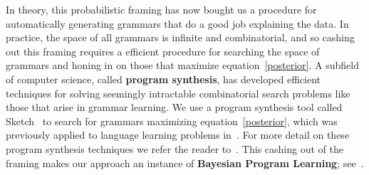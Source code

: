 \documentclass{article}
\begin{document}
In theory, this probabilistic framing
has now bought us a procedure for automatically generating
grammars that do a good job explaining the data.
In practice,
the space of all grammars is infinite and combinatorial,
and so cashing out this framing requires a
efficient procedure for searching the space of grammars and honing in on those that maximize equation~\ref{posterior}.
A subfield of computer science, called \textbf{program synthesis},
has developed efficient techniques for
solving seemingly intractable combinatorial search problems
like those that arise in grammar learning.
We use a program synthesis tool called Sketch~\citep{solar2008program}
to search for grammars maximizing equation~\ref{posterior},
which was previously applied to language learning problems in~\cite{ellis2015unsupervised}.
For more detail on these program synthesis techniques we refer the reader to~\cite{solar2008program}.
This cashing out of the framing makes
our approach an instance of  \textbf{Bayesian Program Learning}; see~\cite{lake2015human}.

\end{document}
